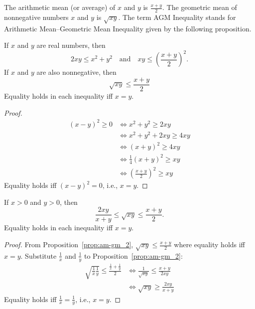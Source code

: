 \documentclass[../main.tex]{subfiles}
\begin{document}
The \textsf{arithmetic mean} (or average) of $x$ and $y$ is $\frac{x + y}{2}$.
The \textsf{geometric mean} of nonnegative numbers $x$ and $y$ is $\sqrt{xy}$.
The term \textsf{AGM Inequality} stands for \textsf{Arithmetic Mean--Geometric Mean Inequality} given by the following proposition.
\begin{prop} \label{prop:am-gm_2}
    If $x$ and $y$ are real numbers, then
    \[
        2xy \leq x^2 + y^2 \quad \text{and} \quad xy \leq \left(\frac{x+y}{2}\right)^2.
    \]
    If $x$ and $y$ are also nonnegative, then
    \[
        \sqrt{xy} \leq \frac{x + y}{2}
    \]
    Equality holds in each inequality iff $x = y$.
\end{prop}
\begin{proof}
    \begin{align*}
        (x - y)^2 \geq 0 &\Leftrightarrow x^2 + y^2 \geq 2xy\\
                         &\Leftrightarrow x^2 + y^2 + 2xy \geq 4xy\\
                         &\Leftrightarrow (x + y)^2 \geq 4xy\\
                         &\Leftrightarrow \frac 1 4 (x + y)^2 \geq xy\\
                         &\Leftrightarrow \left(\frac{x + y}{2}\right)^2 \geq xy
    \end{align*}
    Equality holds iff $(x - y)^2 = 0$, i.e., $x = y$.
\end{proof}

\begin{cor}
    If $x > 0$ and $y > 0$, then
    \[
        \frac{2xy}{x + y} \leq \sqrt{xy} \leq \frac{x + y}{2}.
    \]
    Equality holds in each inequality iff $x = y$.
\end{cor}
\begin{proof}
    From Proposition~\ref{prop:am-gm_2}, $\sqrt{xy} \leq \frac{x + y}{2}$ where equality holds iff $x = y$.
    Substitute $\frac 1 x$ and $\frac 1 y$ to Proposition~\ref{prop:am-gm_2}:
    \begin{align*}
        \sqrt{\frac 1 x \frac 1 y} \leq \frac{\frac 1 x + \frac 1 y}{2} &\Leftrightarrow \frac{1}{\sqrt{xy}} \leq \frac{x + y}{2xy}\\
                                                                        &\Leftrightarrow \sqrt{xy} \geq \frac{2xy}{x + y}
    \end{align*}
    Equality holds iff $\frac 1 x = \frac 1 y$, i.e., $x = y$.
\end{proof}
\end{document}
